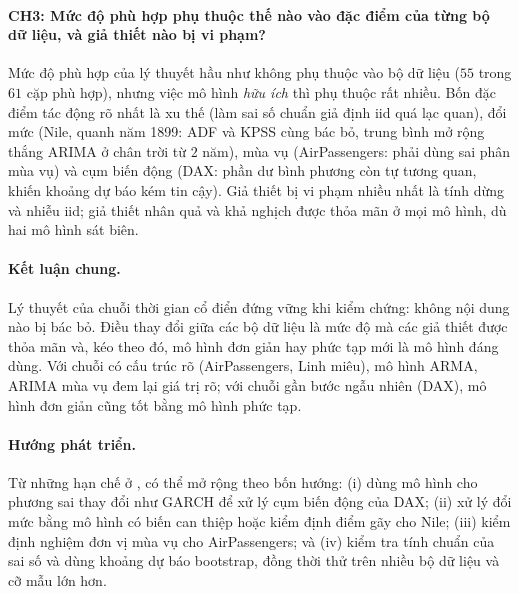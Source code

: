 \paragraph{CH3: Mức độ phù hợp phụ thuộc thế nào vào đặc điểm của từng bộ dữ liệu, và giả thiết nào bị vi phạm?}
Mức độ phù hợp của lý thuyết hầu như không phụ thuộc vào bộ dữ liệu ($55$ trong $61$ cặp phù hợp), nhưng việc mô hình \emph{hữu ích} thì phụ thuộc rất nhiều. Bốn đặc điểm tác động rõ nhất là xu thế (làm sai số chuẩn giả định iid quá lạc quan), đổi mức (Nile, quanh năm 1899: ADF và KPSS cùng bác bỏ, trung bình mở rộng thắng ARIMA ở chân trời từ $2$ năm), mùa vụ (AirPassengers: phải dùng sai phân mùa vụ) và cụm biến động (DAX: phần dư bình phương còn tự tương quan, khiến khoảng dự báo kém tin cậy). Giả thiết bị vi phạm nhiều nhất là tính dừng và nhiễu iid; giả thiết nhân quả và khả nghịch được thỏa mãn ở mọi mô hình, dù hai mô hình sát biên.

\paragraph{Kết luận chung.}
Lý thuyết của chuỗi thời gian cổ điển đứng vững khi kiểm chứng: không nội dung nào bị bác bỏ. Điều thay đổi giữa các bộ dữ liệu là mức độ mà các giả thiết được thỏa mãn và, kéo theo đó, mô hình đơn giản hay phức tạp mới là mô hình đáng dùng. Với chuỗi có cấu trúc rõ (AirPassengers, Linh miêu), mô hình ARMA, ARIMA mùa vụ đem lại giá trị rõ; với chuỗi gần bước ngẫu nhiên (DAX), mô hình đơn giản cũng tốt bằng mô hình phức tạp.

\paragraph{Hướng phát triển.}
Từ những hạn chế ở , có thể mở rộng theo bốn hướng: (i) dùng mô hình cho phương sai thay đổi như GARCH để xử lý cụm biến động của DAX; (ii) xử lý đổi mức bằng mô hình có biến can thiệp hoặc kiểm định điểm gãy cho Nile; (iii) kiểm định nghiệm đơn vị mùa vụ cho AirPassengers; và (iv) kiểm tra tính chuẩn của sai số và dùng khoảng dự báo bootstrap, đồng thời thử trên nhiều bộ dữ liệu và cỡ mẫu lớn hơn.
